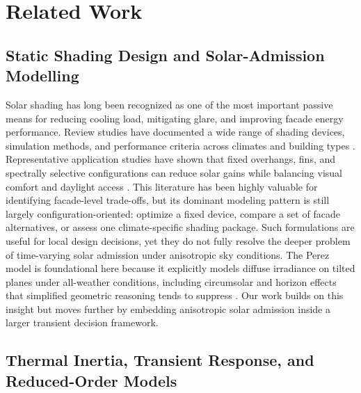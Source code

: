 \documentclass[preprint,12pt]{elsarticle}
\begin{document}
\section{Related Work}
\label{sec:related}

\subsection{Static Shading Design and Solar-Admission Modelling}

Solar shading has long been recognized as one of the most important passive means for reducing cooling load, mitigating glare, and improving facade energy performance. Review studies have documented a wide range of shading devices, simulation methods, and performance criteria across climates and building types \cite{kirimtat2016}. Representative application studies have shown that fixed overhangs, fins, and spectrally selective configurations can reduce solar gains while balancing visual comfort and daylight access \cite{valladares2014,nazari2023}. This literature has been highly valuable for identifying facade-level trade-offs, but its dominant modeling pattern is still largely configuration-oriented: optimize a fixed device, compare a set of facade alternatives, or assess one climate-specific shading package. Such formulations are useful for local design decisions, yet they do not fully resolve the deeper problem of time-varying solar admission under anisotropic sky conditions. The Perez model is foundational here because it explicitly models diffuse irradiance on tilted planes under all-weather conditions, including circumsolar and horizon effects that simplified geometric reasoning tends to suppress \cite{perez1990}. Our work builds on this insight but moves further by embedding anisotropic solar admission inside a larger transient decision framework.

\subsection{Thermal Inertia, Transient Response, and Reduced-Order Models}
\end{document}

